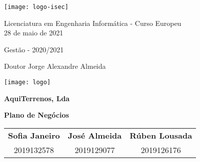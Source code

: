 \begin{titlepage}
	\begin{center}
		
		\texttt{[image: logo-isec]}
		
		\normalsize
		Licenciatura em Engenharia Informática - Curso Europeu \\
		28 de maio de 2021
		
		\LARGE
		Gestão - 2020/2021
		
		\large
		Doutor Jorge Alexandre Almeida
		
		\vspace{1.5cm}
		
		\texttt{[image: logo]}

		\vspace{0.5cm}

		\Huge
		\textbf{AquiTerrenos, Lda}
		
		\LARGE
		\textbf{Plano de Negócios}
		
		\vspace*{\fill}
		
		\Large
		
		\begin{tabular}{ccc}
			\textbf{Sofia Janeiro} & \textbf{José Almeida} & \textbf{Rúben Lousada} \\ 
			2019132578 & 2019129077 & 2019126176 \\
		\end{tabular}
	
		\vspace{.5cm}
		
		\vfill
		\vspace*{\fill}
		
		
	\end{center}
\end{titlepage}